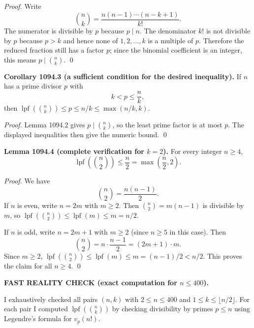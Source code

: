 \smallskip
\noindent\emph{Proof.}
Write
\[
\binom{n}{k}=\frac{n(n-1)\cdots(n-k+1)}{k!}.
\]
The numerator is divisible by $p$ because $p\mid n$. The denominator $k!$ is not divisible by $p$ because $p>k$ and hence none of $1,2,\dots,k$ is a multiple of $p$. Therefore the reduced fraction still has a factor $p$; since the binomial coefficient is an integer, this means $p\mid\binom{n}{k}$. \qed

\smallskip
\noindent\textbf{Corollary 1094.3 (a sufficient condition for the desired inequality).}
If $n$ has a prime divisor $p$ with
\[
k<p\le \frac{n}{k},
\]
then $\operatorname{lpf}(\binom{n}{k})\le p\le n/k\le \max(n/k,k)$.

\smallskip
\noindent\emph{Proof.}
Lemma 1094.2 gives $p\mid\binom{n}{k}$, so the least prime factor is at most $p$. The displayed inequalities then give the numeric bound. \qed

\smallskip
\noindent\textbf{Lemma 1094.4 (complete verification for $k=2$).}
For every integer $n\ge 4$,
\[
\operatorname{lpf}\!\left(\binom{n}{2}\right)\le \frac{n}{2} = \max\left(\frac{n}{2},2\right).
\]

\smallskip
\noindent\emph{Proof.}
We have
\[
\binom{n}{2}=\frac{n(n-1)}{2}.
\]
If $n$ is even, write $n=2m$ with $m\ge 2$. Then $\binom{n}{2}=m(n-1)$ is divisible by $m$, so $\operatorname{lpf}(\binom{n}{2})\le \operatorname{lpf}(m)\le m=n/2$.

If $n$ is odd, write $n=2m+1$ with $m\ge 2$ (since $n\ge 5$ in this case). Then
\[
\binom{n}{2}=n\cdot\frac{n-1}{2}=(2m+1)\cdot m.
\]
Since $m\ge 2$, $\operatorname{lpf}(\binom{n}{2})\le \operatorname{lpf}(m)\le m=(n-1)/2 < n/2$.
This proves the claim for all $n\ge 4$. \qed

\smallskip
\noindent\textbf{FAST REALITY CHECK (exact computation for $n\le 400$).}

\smallskip
\noindent
I exhaustively checked all pairs $(n,k)$ with $2\le n\le 400$ and $1\le k\le \lfloor n/2\rfloor$. For each pair I computed $\operatorname{lpf}(\binom{n}{k})$ by checking divisibility by primes $p\le n$ using Legendre's formula for $v_p(n!)$.

